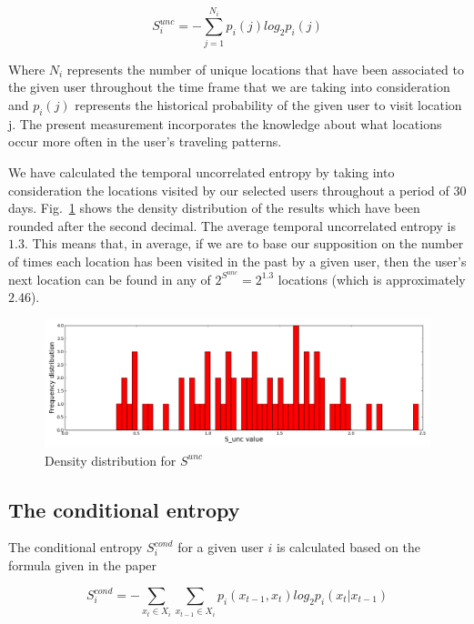 \begin{equation}
S_{i}^{unc} = -\sum\limits_{j=1}^{N_{i}}p_{i}(j)log_{2}p_{i}(j)
\end{equation}

Where $N_{i}$ represents the number of unique locations that have been
associated to the given user throughout the time frame that we are taking into
consideration and $p_{i}(j)$ represents the historical probability of the given
user to visit location j. The present measurement incorporates the knowledge
about what locations occur more often in the user's traveling patterns.

We have calculated the temporal uncorrelated entropy by taking into
consideration the locations visited by our selected users throughout a period of
$30$ days. Fig.~\ref{dis_tu_e} shows the density distribution of the results
which have been rounded after the second decimal. The average temporal
uncorrelated entropy is $1.3$. This means that, in average, if we are to base
our supposition on the number of times each location has been visited in the
past by a given user, then the user's next location can be found in any of
$2^{S^{unc}} = 2^{1.3}$ locations (which is approximately $2.46$).

\begin{figure}[!h]
\centering
\includegraphics[width=\textwidth]{figures/entro_pred/tu_entro_distrib.png}
\caption{Density distribution for $S^{unc}$}
\label{dis_tu_e}
\end{figure}

\subsection{The conditional entropy}
\label{con_e}
The conditional entropy $S_{i}^{cond}$ for a given user $i$ is calculated based
on the formula given in the paper \cite{Sinatra14}

\begin{equation}
S_{i}^{cond} = - \sum\limits_{x_{t}\in X_{i}} \sum\limits_{x_{t-1}\in X_{i}}
p_{i}(x_{t-1},x_{t})log_{2}p_{i}(x_{t}|x_{t-1})
\end{equation}

